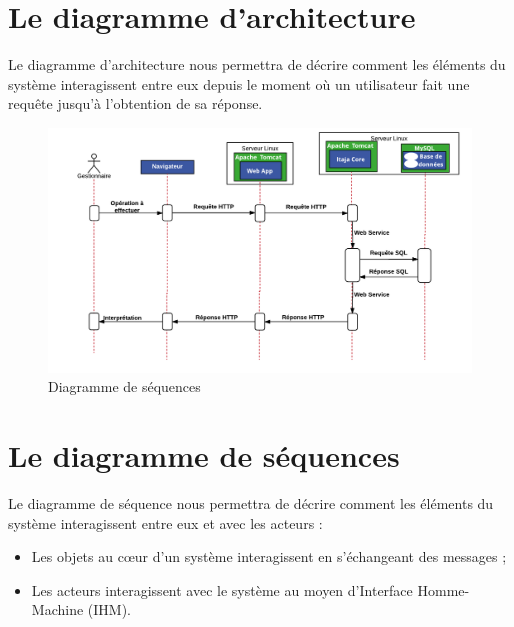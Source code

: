 \documentclass[12pt]{report}
\begin{document}
      \section{Le diagramme d'architecture}
      Le diagramme d'architecture nous permettra de décrire comment les éléments du système interagissent entre eux depuis le moment où un utilisateur fait une requête jusqu'à l'obtention de sa réponse.

	\begin{figure}[H]
		\begin{center}
		  \includegraphics[scale=0.7]{images/diagramArchitecture.png}
		  \caption{Diagramme de séquences}
		\end{center}
	  \end{figure}
	  
       \section{Le diagramme de séquences}
      Le diagramme de séquence nous permettra de décrire comment les éléments du système interagissent entre eux et avec les acteurs :
      \begin{itemize}
	\item Les objets au cœur d’un système interagissent en s’échangeant des messages ;
	\item Les acteurs interagissent avec le système au moyen d’Interface Homme-Machine (IHM).
      \end{itemize}
\end{document}
